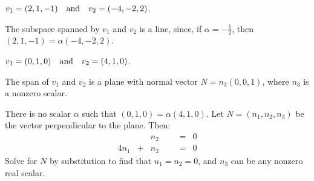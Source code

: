 \documentclass{ximera}
\begin{document}
\begin{exercise} \label{c5.7.1b}
$v_1=(2,1,-1) \quad\mbox{and}\quad v_2=(-4,-2,2)$.

\begin{solution}
\ans The subspace spanned by $v_1$ and $v_2$ is a line,
since, if $\alpha = -\frac{1}{2}$, then $(2,1,-1) = \alpha(-4,-2,2)$.

\end{solution}
\end{exercise}
\begin{exercise} \label{c5.7.1c}
$v_1=(0,1,0) \quad\mbox{and}\quad v_2=(4,1,0)$.

\begin{solution}
\ans The span of $v_1$ and $v_2$ is a plane with normal
vector $N = n_3(0,0,1)$, where $n_3$ is a nonzero scalar.

\soln There is no scalar $\alpha$ such that $(0,1,0) = \alpha(4,1,0)$. 
Let $N = (n_1,n_2,n_3)$ be the vector perpendicular to the plane.  Then:
\[
\begin{array}{rrrrrcl}
& & n_2 & & & = & 0 \\
4n_1 & + & n_2 & & & = & 0 \end{array}
\]
Solve for $N$ by substitution to find that $n_1 = n_2 = 0$, and
$n_3$ can be any nonzero real scalar.

\end{solution}
\end{exercise}
\end{document}
